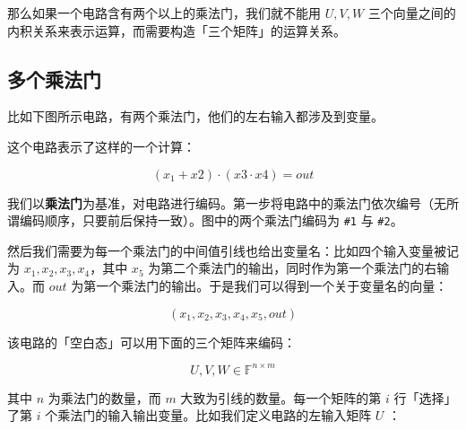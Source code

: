 那么如果一个电路含有两个以上的乘法门，我们就不能用 \(U,V,W\)
三个向量之间的内积关系来表示运算，而需要构造「三个矩阵」的运算关系。

\hypertarget{ux591aux4e2aux4e58ux6cd5ux95e8}{%
\subsection{多个乘法门}\label{ux591aux4e2aux4e58ux6cd5ux95e8}}

比如下图所示电路，有两个乘法门，他们的左右输入都涉及到变量。


这个电路表示了这样的一个计算：

\[
(x_1 + x2) \cdot (x3 \cdot x4) = out
\]

我们以\textbf{乘法门}为基准，对电路进行编码。第一步将电路中的乘法门依次编号（无所谓编码顺序，只要前后保持一致）。图中的两个乘法门编码为
\texttt{\#1} 与 \texttt{\#2}。

然后我们需要为每一个乘法门的中间值引线也给出变量名：比如四个输入变量被记为
\(x_1, x_2, x_3, x_4\)，其中 \(x_5\)
为第二个乘法门的输出，同时作为第一个乘法门的右输入。而 \(out\)
为第一个乘法门的输出。于是我们可以得到一个关于变量名的向量：

\[
(x_1, x_2, x_3, x_4, x_5, out)
\]

该电路的「空白态」可以用下面的三个矩阵来编码：

\[
U, V, W \in \mathbb{F}^{n\times m}
\]

其中 \(n\) 为乘法门的数量，而 \(m\) 大致为引线的数量。每一个矩阵的第
\(i\) 行「选择」了第 \(i\)
个乘法门的输入输出变量。比如我们定义电路的左输入矩阵 \(U\) ：




